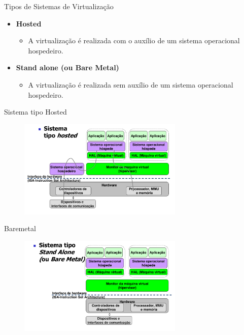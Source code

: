 \documentclass{beamer}
\begin{document}
\begin{frame}{Tipos de Sistemas de Virtualização}
    \begin{itemize}
        \item \textbf{Hosted}
        \begin{itemize}
            \item A virtualização é realizada com o auxílio de um sistema operacional hospedeiro.
        \end{itemize}

        \item \textbf{Stand alone (ou Bare Metal)}
        \begin{itemize}
            \item A virtualização é realizada sem auxílio de um sistema operacional hospedeiro.
        \end{itemize}
    \end{itemize}
\end{frame}

\begin{frame}[fragile]{Sistema tipo Hosted}

    \begin{figure}[H]
        \centerline{\includegraphics[width=0.7\textwidth]{assets/aula-tads-sope/aula-03-04.png}}

    \end{figure}
\end{frame}
\begin{frame}[fragile]{Baremetal}

    \begin{figure}[H]
        \centerline{\includegraphics[width=0.7\textwidth]{assets/aula-tads-sope/aula-03-05.png}}

    \end{figure}
\end{frame}
\end{document}

